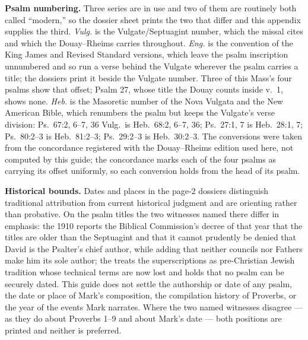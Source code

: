 \textbf{Psalm numbering.} Three series are in use and two of them are routinely
both called ``modern,'' so the dossier sheet prints the two that differ and this
appendix supplies the third. \textit{Vulg.} is the Vulgate/Septuagint number,
which the missal cites and which the Douay--Rheims carries throughout.
\textit{Eng.} is the convention of the King James and Revised Standard
versions, which leave the psalm inscription unnumbered and so run a verse
behind the Vulgate wherever the psalm carries a title; the dossiers print it
beside the Vulgate number. Three of this Mass's four psalms show that offset;
Psalm 27, whose title the Douay counts inside v.~1, shows none.
\textit{Heb.} is the Masoretic number of the Nova Vulgata and the New American
Bible, which renumbers the psalm but keeps the Vulgate's verse division:
Ps.~67:2, 6--7, 36 Vulg.\ is Heb.\ 68:2, 6--7, 36; Ps.~27:1, 7 is Heb.\ 28:1, 7;
Ps.~80:2--3 is Heb.\ 81:2--3; Ps.~29:2--3 is Heb.\ 30:2--3. The conversions were
taken from the concordance registered with the Douay--Rheims edition used here,
not computed by this guide; the concordance marks each of the four psalms as
carrying its offset uniformly, so each conversion holds from the head of its
psalm.

\textbf{Historical bounds.} Dates and places in the page-2 dossiers distinguish
traditional attribution from current historical judgment and are orienting
rather than probative. On the psalm titles the two witnesses named there differ
in emphasis: the 1910  reports the Biblical
Commission's decree of that year that the titles are older than the Septuagint
and that it cannot prudently be denied that David is the Psalter's chief
author, while adding that neither councils nor Fathers make him its sole
author; the  treats the superscriptions as pre-Christian Jewish
tradition whose technical terms are now lost and holds that no psalm can be
securely dated. This guide does not settle the authorship or date of any
psalm, the date or place of Mark's composition, the compilation history of
Proverbs, or the year of the events Mark narrates. Where the two named
witnesses disagree --- as they do about Proverbs 1--9 and about Mark's date ---
both positions are printed and neither is preferred.

